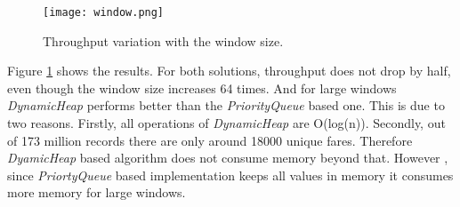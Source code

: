 \begin{figure}[!t]
        \centering
        \texttt{[image: window.png]}
        \caption{Throughput variation with the window size.}
        \label{window}
\end{figure}

Figure \ref{window} shows the results. For both solutions, throughput does not drop by half, even though the window size increases 64 times. And for large windows \textit{DynamicHeap} performs better than the \textit{PriorityQueue} based one. This is due to two reasons. Firstly, all operations of \textit{DynamicHeap} are O(log(n)). Secondly, out of 173 million records there are only around 18000 unique fares. Therefore \textit{DyamicHeap} based algorithm does not consume memory beyond that. However , since \textit{PriortyQueue} based implementation keeps all values in memory it consumes more memory for large windows.
